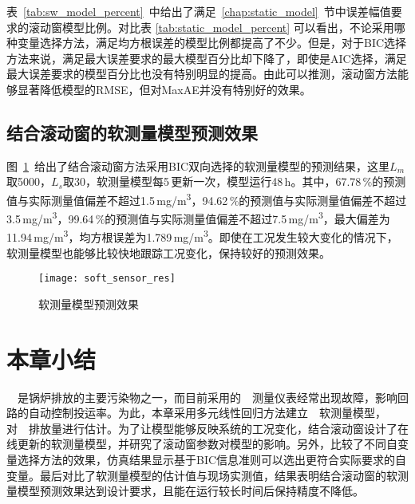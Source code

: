 表~\ref{tab:sw_model_percent}~中给出了满足~\ref{chap:static_model}~节中误差幅值要求的滚动窗模型比例。对比表 \ref{tab:static_model_percent} 可以看出，不论采用哪种变量选择方法，满足均方根误差的模型比例都提高了不少。但是，对于BIC选择方法来说，满足最大误差要求的最大模型百分比却下降了，即使是AIC选择，满足最大误差要求的模型百分比也没有特别明显的提高。由此可以推测，滚动窗方法能够显著降低模型的RMSE，但对MaxAE并没有特别好的效果。


\subsection{结合滚动窗的软测量模型预测效果}
图~\ref{fig:soft_sensor_res}~给出了结合滚动窗方法采用BIC双向选择的软测量模型的预测结果，这里$L_m$取5000，$L_s$取30，软测量模型每5$\,$\si{\min}更新一次，模型运行48$\,$\si{\hour}。其中，67.78$\,\%$的预测值与实际测量值偏差不超过1.5$\,$\si{mg/m^3}，94.62$\,\%$的预测值与实际测量值偏差不超过3.5$\,$\si{mg/m^3}，99.64$\,\%$的预测值与实际测量值偏差不超过7.5$\,$\si{mg/m^3}，最大偏差为11.94$\,$\si{mg/m^3}，均方根误差为1.789$\,$\si{mg/m^3}。即使在工况发生较大变化的情况下，软测量模型也能够比较快地跟踪工况变化，保持较好的预测效果。
\begin{figure}[!hbt]
\centering
\texttt{[image: soft\_sensor\_res]}
\caption{软测量模型预测效果} \label{fig:soft_sensor_res}
\end{figure}

\section{本章小结}
~~是锅炉排放的主要污染物之一，而目前采用的~~测量仪表经常出现故障，影响回路的自动控制投运率。为此，本章采用多元线性回归方法建立~~软测量模型，对~~排放量进行估计。为了让模型能够反映系统的工况变化，结合滚动窗设计了在线更新的软测量模型，并研究了滚动窗参数对模型的影响。另外，比较了不同自变量选择方法的效果，仿真结果显示基于BIC信息准则可以选出更符合实际要求的自变量。最后对比了软测量模型的估计值与现场实测值，结果表明结合滚动窗的软测量模型预测效果达到设计要求，且能在运行较长时间后保持精度不降低。

